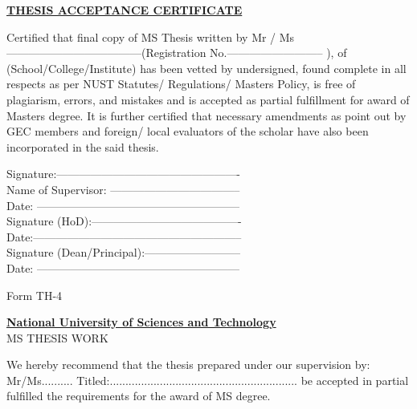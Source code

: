 \documentclass[a4paper, 12pt, twoside]{report}
\theoremstyle{definition}
\begin{document}
\NoBgThispage
\newpage
{}
\thispagestyle{empty}
\begin{center}
\textbf{\underline {THESIS ACCEPTANCE CERTIFICATE}}
\end{center}
Certified that final copy of MS Thesis written by Mr / Ms ------------------------------------(Registration No.-------------------------- ), of 			 (School/College/Institute) has been vetted by undersigned, found complete in all respects as per NUST Statutes/ Regulations/ Masters Policy, is free of plagiarism, errors, and mistakes and is accepted as partial fulfillment for award of Masters degree. It is further certified that necessary amendments as point out by GEC members and foreign/ local evaluators of
the scholar have also been incorporated in the said thesis.
\vspace{1cm}
\begin{flushright}
Signature:------------------------------------------------- \\	\vspace{.3cm}				Name of Supervisor: ----------------------------------- \\	\vspace{.3cm}			
Date: ------------------------------------------------------\\ \vspace{.8cm}
Signature (HoD):----------------------------------------\\	\vspace{.3cm}				
Date:--------------------------------------------------------\\ \vspace{.8cm}
Signature (Dean/Principal):--------------------------\\	\vspace{.3cm}		
Date: ------------------------------------------------------								
\end{flushright}

\newpage
{}
\thispagestyle{empty}
\begin{flushright}
Form TH-4
\end{flushright}
\begin{center}
\textbf{\underline{ National University of Sciences and Technology} }\\\vspace{.2cm}
MS THESIS WORK
\end{center}

We hereby recommend that the thesis prepared under our supervision by: Mr/Ms..........
Titled:............................................................ be accepted in partial fulfilled the requirements for the award of MS degree.
\end{document}

